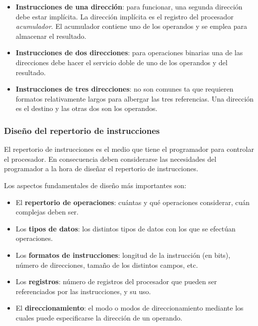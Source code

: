 \begin{subs}
  \begin{itemize}
    \item \textbf{Instrucciones de una dirección}: para funcionar, una segunda dirección debe estar implícita. La dirección implícita es el registro del procesador \textit{acumulador}. El acumulador contiene uno de los operandos y se emplea para almacenar el resultado.
    \item \textbf{Instrucciones de dos direcciones}: para operaciones binarias una de las direcciones debe hacer el servicio doble de uno de los operandos y del resultado.
    \item \textbf{Instrucciones de tres direcciones}: no son comunes ta que requieren formatos relativamente largos para albergar las tres referencias. Una dirección es el destino y las otras dos son los operandos.
  \end{itemize}

  \subsubsection{Diseño del repertorio de instrucciones}

  El repertorio de instrucciones es el medio que tiene el programador para controlar el procesador. En consecuencia deben considerarse las necesidades del programador a la hora de diseñar el repertorio de instrucciones.

  Los aspectos fundamentales de diseño más importantes son:

  \begin{itemize}
    \item El \textbf{repertorio de operaciones}: cuántas y qué operaciones considerar, cuán complejas deben ser.
    \item Los \textbf{tipos de datos}: los distintos tipos de datos con los que se efectúan operaciones.
    \item Los \textbf{formatos de instrucciones}: longitud de la instrucción (en bits), número de direcciones, tamaño de los distintos campos, etc.
    \item Los \textbf{registros}: número de registros del procesador que pueden ser referenciados por las instrucciones, y su uso.
    \item El \textbf{direccionamiento}: el modo o modos de direccionamiento mediante los cuales puede especificarse la dirección de un operando.
  \end{itemize}

\end{subs}

